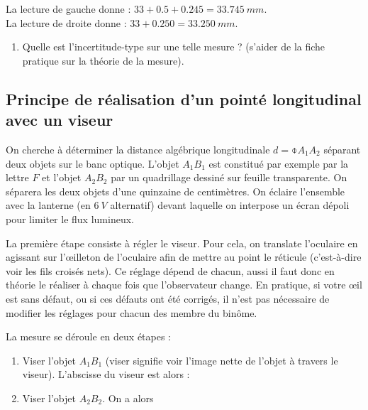 \documentclass[a4paper, 12pt, final, garamond]{book}
\begin{document}
La lecture de gauche donne : $33+\num{0,5}+\num{0,245} = \SI{33,745}{mm}$.\\
La lecture de droite donne : $33+\num{0,250} = \SI{33,250}{mm}$.

\begin{enumerate}
    \item Quelle est l'incertitude-type sur une telle mesure ? (s'aider de la
        fiche pratique sur la théorie de la mesure).
\end{enumerate}

\subsection{Principe de réalisation d'un pointé longitudinal avec un viseur}

On cherche à déterminer la distance algébrique longitudinale $d = \obar{A_1A_2}$
séparant deux objets sur le banc optique. L'objet $A_1B_1$ est constitué par
exemple par la lettre $F$ et l'objet $A_2B_2$ par un quadrillage dessiné sur
feuille transparente. On séparera les deux objets d'une quinzaine de
centimètres. On éclaire l'ensemble avec la lanterne (en $\SI{6}{V}$ alternatif)
devant laquelle on interpose un écran dépoli pour limiter le flux lumineux. 


La première étape consiste à régler le viseur. Pour cela, on translate
l'oculaire en agissant sur l'œilleton de l'oculaire afin de mettre au point le
réticule (c'est-à-dire voir les fils croisés nets). Ce réglage dépend de chacun,
aussi il faut donc en théorie le réaliser à chaque fois que l'observateur
change. En pratique, si votre œil est sans défaut, ou si ces défauts ont été
corrigés, il n'est pas nécessaire de modifier les réglages pour chacun des
membre du binôme. 

\bigskip

La mesure se déroule en deux étapes : 

\begin{enumerate}[label=\alph*)]
    \item Viser l'objet $A_1B_1$ (viser signifie voir l'image nette de l'objet à
        travers le viseur). L'abscisse du viseur est alors :\\

    \item Viser l'objet $A_2B_2$. On a alors\\
\end{enumerate}
\end{document}
